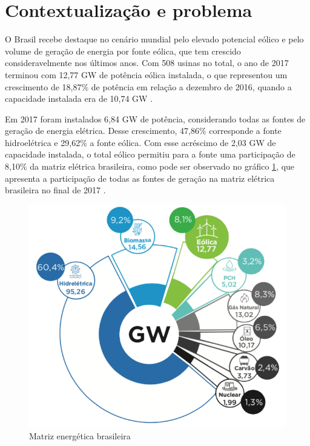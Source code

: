 
\label{Cap:fundamentacao}

\section{Contextualização e problema}
\label{contextualização}








O Brasil recebe destaque no cenário mundial pelo elevado potencial eólico e pelo volume de geração de energia por fonte eólica, que tem crescido consideravelmente nos últimos anos. Com 508 usinas no total, o ano de 2017 terminou com 12,77 GW de potência eólica instalada, o que representou um crescimento de 18,87\% de potência em relação a dezembro de 2016, quando a capacidade instalada era de 10,74 GW \cite{boletim-anual-geracao-2017}.

Em 2017 foram instalados 6,84 GW de potência, considerando todas as fontes de geração de energia elétrica. Desse crescimento, 47,86\% corresponde a fonte hidroelétrica e 29,62\% a fonte eólica. Com esse acréscimo de 2,03 GW de capacidade instalada, o total eólico permitiu para a fonte uma participação de 8,10\% da matriz elétrica brasileira, como pode ser observado no gráfico \ref{Fig:matriz-energetica-brasileira}, que apresenta a participação de todas as fontes de geração na matriz elétrica brasileira no final de 2017 \cite{boletim-anual-geracao-2017}.

\begin{figure}[htbp!] \begin{center}
\includegraphics[width=0.75\linewidth]{./figuras/matriz-energetica-brasileira}
\caption{Matriz energética brasileira}
\label{Fig:matriz-energetica-brasileira}
\end{center} 
\end{figure}

